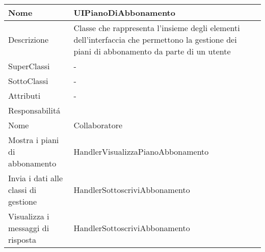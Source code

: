 \begin{center}
    \begin{longtable}{ |p{3cm}|p{3cm}|p{3cm}|p{3cm}| }
        \hline
        Nome & \multicolumn{3}{|p{9cm}|}{UIPianoDiAbbonamento} \\\hline
        Descrizione & \multicolumn{3}{|p{9cm}|}{Classe che rappresenta l'insieme degli elementi dell'interfaccia che permettono la gestione dei piani di abbonamento da parte di un utente} \\\hline
        SuperClassi & \multicolumn{3}{|p{9cm}|}{-} \\\hline
        SottoClassi & \multicolumn{3}{|p{9cm}|}{-} \\\hline
        Attributi & \multicolumn{3}{|p{9cm}|}{-} \\\hline
        \multicolumn{4}{|p{12cm}|}{Responsabilit\'a} \\\hline
        \multicolumn{2}{|p{5cm}|}{Nome} & \multicolumn{2}{|p{7cm}|}{Collaboratore} \\\hline
        \multicolumn{2}{|p{5cm}|}{Mostra i piani di abbonamento} & \multicolumn{2}{|p{7cm}|}{HandlerVisualizzaPianoAbbonamento} \\\hline
        \multicolumn{2}{|p{5cm}|}{Invia i dati alle classi di gestione} & \multicolumn{2}{|p{7cm}|}{HandlerSottoscriviAbbonamento} \\\hline
        \multicolumn{2}{|p{5cm}|}{Visualizza i messaggi di risposta} & \multicolumn{2}{|p{7cm}|}{HandlerSottoscriviAbbonamento} \\\hline
    \end{longtable}
\end{center}

